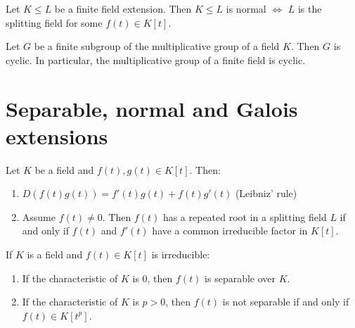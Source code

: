 \documentclass{article}
\begin{document}


\begin{nthm}\label{thm:1.26}
    Let $K \leq L$ be a finite field extension. Then $K \leq L$ is normal $\iff$ $L$ is the splitting field for some $f(t) \in K[t]$.
\end{nthm}


\begin{nthm}\label{thm:1.28}
    Let $G$ be a finite subgroup of the multiplicative group of a field $K$. Then $G$ is cyclic. In particular, the multiplicative group of a finite field is cyclic.
\end{nthm}

\clearpage
\section{Separable, normal and Galois extensions}



\begin{nlemma}\label{lem:2.3}
    Let $K$ be a field and $f(t), g(t) \in K[t]$. Then:
    \begin{enumerate}[label=(\alph*)]
        \item $D(f(t) g(t)) = f'(t) g(t) + f(t) g'(t)$ (Leibniz' rule)
        \item Assume $f(t) \neq 0$. Then $f(t)$ has a repeated root in a splitting field $L$ if and only if $f(t)$ and $f'(t)$ have a common irreducible factor in $K[t]$.
    \end{enumerate}
\end{nlemma}

\begin{ncor}\label{cor:2.4}
    If $K$ is a field and $f(t) \in K[t]$ is irreducible:
    \begin{enumerate}[label=(\roman*)]
        \item If the characteristic of $K$ is 0, then $f(t)$ is separable over $K$.
        \item If the characteristic of $K$ is $p>0$, then $f(t)$ is not separable if and only if $f(t) \in K[t^p]$.
    \end{enumerate}
\end{ncor}
\end{document}
